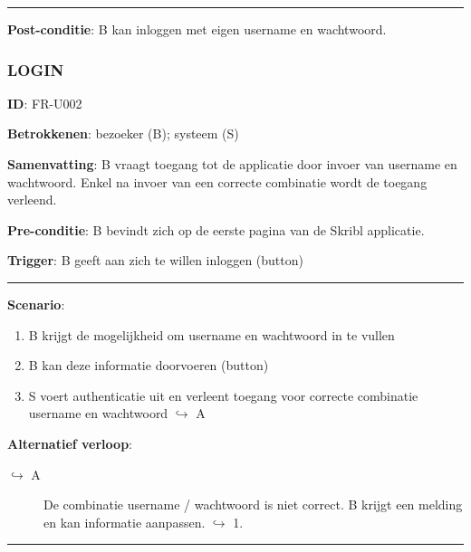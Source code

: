 \vspace{2 mm}
\hrule
\vspace{4 mm}

\noindent \textbf{Post-conditie}: B kan inloggen met eigen username en wachtwoord. \\




\subsubsection{LOGIN}
\vspace{2 mm}

\textbf{ID}: FR-U002
\vspace{2 mm}

\noindent \textbf{Betrokkenen}: bezoeker (B); systeem (S) 
\vspace{2 mm}

\noindent \textbf{Samenvatting}: B vraagt toegang tot de applicatie door invoer van username en wachtwoord. Enkel na invoer van een correcte combinatie wordt de toegang verleend. 
\vspace{2 mm}

\noindent \textbf{Pre-conditie}: B bevindt zich op de eerste pagina van de Skribl applicatie. 
\vspace{2 mm}

\noindent \textbf{Trigger}: B geeft aan zich te willen inloggen (button)

\vspace{4 mm}
\hrule
\vspace{2 mm}
\noindent \textbf{Scenario}:
\begin{enumerate}
\item B krijgt de mogelijkheid om username en wachtwoord in te vullen    
 \item B kan deze informatie doorvoeren (button)
  \item S voert authenticatie uit en verleent toegang voor correcte combinatie username en wachtwoord   $\hookrightarrow$ A
\end{enumerate}
\noindent \textbf{Alternatief verloop}:
\begin{description}
\item[ $\hookrightarrow$ A] De combinatie username / wachtwoord is niet correct. B krijgt een melding en kan informatie aanpassen. $\hookrightarrow$ 1.
\end{description}

\vspace{2 mm}
\hrule
\vspace{4 mm}

